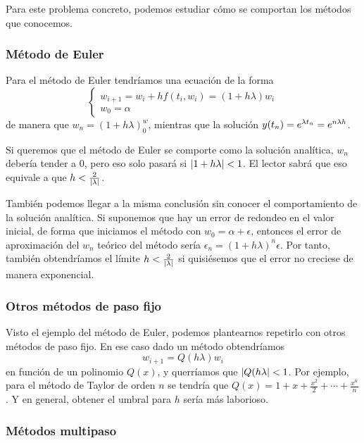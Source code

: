 Para este problema concreto,
podemos estudiar cómo se comportan los métodos que conocemos.

\subsubsection{Método de Euler}

Para el método de Euler tendríamos una ecuación de la forma
%
\begin{equation*}
    \begin{cases}
        w_{i+1} = w_i + hf(t_i, w_i) = (1 + h\lambda)w_i \\
        w_0 = \alpha
    \end{cases}
\end{equation*}
%
de manera que $w_n = (1 + h\lambda)^w_0$,
mientras que la solución $y(t_n) = e^{\lambda t_n} = e^{n\lambda h}$.

Si queremos que el método de Euler se comporte como la solución analítica,
$w_n$ debería tender a $0$,
pero eso solo pasará si $\abs{1 + h\lambda} < 1$.
El lector sabrá que eso equivale a que $h < \frac{2}{\abs{\lambda}}$.

También podemos llegar a la misma conclusión
sin conocer el comportamiento de la solución analítica.
Si suponemos que hay un error de redondeo en el valor inicial,
de forma que iniciamos el método con $w_0 = \alpha + \epsilon$,
entonces el error de aproximación del $w_n$ teórico del método sería
$\epsilon_n = (1 + h\lambda)^n\epsilon$.
Por tanto, también obtendríamos el límite $h < \frac{2}{\abs{\lambda}}$
si quisiésemos que el error no creciese de manera exponencial.

\subsubsection{Otros métodos de paso fijo}

Visto el ejemplo del método de Euler,
podemos plantearnos repetirlo con otros métodos de paso fijo.
En ese caso dado un método obtendríamos
%
\begin{equation}\label{eqn:polq-one-step}
    w_{i+1} = Q(h\lambda)w_i
\end{equation}
%
en función de un polinomio $Q(x)$,
y querríamos que $\abs{Q(h\lambda} < 1$.
Por ejemplo, para el método de Taylor de orden $n$ se tendría que
$Q(x) = 1 + x + \frac{x^2}{2} + \cdots + \frac{x^n}{n}$.
Y en general, obtener el umbral para $h$ sería más laborioso.

\subsubsection{Métodos multipaso}

